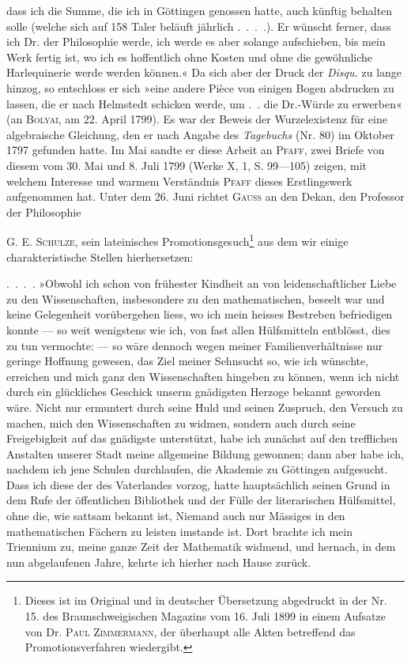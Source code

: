 dass ich die Summe, die ich in Göttingen genossen hatte, auch künftig behalten
solle (welche sich auf 158 Taler beläuft jährlich .\ .\ .\ .). Er wünscht
ferner, dass ich Dr. der Philosophie werde, ich werde es aber solange aufschieben,
bis mein Werk fertig ist, wo ich es hoffentlich ohne Kosten und
ohne die gewöhnliche Harlequinerie werde werden können.« Da sich aber der
Druck der \textit{Disqu.} zu lange hinzog, so entschloss er sich »eine andere Pièce
von einigen Bogen abdrucken zu lassen, die er nach Helmstedt schicken werde,
um .\ . die Dr.-Würde zu erwerben« (an \textsc{Bolyai}, am 22. April 1799). Es war
der Beweis der Wurzelexistenz für eine algebraische Gleichung, den er nach
Angabe des \textit{Tagebuchs} (Nr. 80) im Oktober 1797 gefunden hatte. Im Mai
sandte er diese Arbeit an \textsc{Pfaff}, zwei Briefe von diesem vom 30. Mai und
8. Juli 1799 (Werke X, 1, S. 99—105) zeigen, mit welchem Interesse und
warmem Verständnis \textsc{Pfaff} dieses Erstlingswerk aufgenommen hat. Unter
dem 26. Juni richtet \textsc{Gauss} an den Dekan, den Professor der Philosophie\par
\clearpage{}
\noindent \textsc{G. E. Schulze}, sein lateinisches Promotionsgesuch\footnote{Dieses ist im Original und in deutscher Übersetzung abgedruckt in der Nr. 15. des Braunschweigischen Magazins vom 16. Juli 1899 in einem Aufsatze von Dr. \textsc{Paul Zimmermann}, der überhaupt alle Akten betreffend das Promotionsverfahren wiedergibt.} aus dem wir einige charakteristische
Stellen hierhersetzen:

.\ .\ .\ . »Obwohl ich schon von frühester Kindheit an von leidenschaftlicher
Liebe zu den Wissenschaften, insbesondere zu den mathematischen,
beseelt war und keine Gelegenheit vorübergehen liess, wo ich
mein heisses Bestreben befriedigen konnte — so weit wenigstens wie ich,
von fast allen Hülfsmitteln entblösst, dies zu tun vermochte: — so wäre
dennoch wegen meiner Familienverhältnisse nur geringe Hoffnung gewesen,
das Ziel meiner Sehnsucht so, wie ich wünschte, erreichen und mich ganz
den Wissenschaften hingeben zu können, wenn ich nicht durch ein glückliches
Geschick unserm gnädigsten Herzoge bekannt geworden wäre. Nicht
nur ermuntert durch seine Huld und seinen Zuspruch, den Versuch zu machen,
mich den Wissenschaften zu widmen, sondern auch durch seine Freigebigkeit
auf das gnädigste unterstützt, habe ich zunächst auf den trefflichen Anstalten
unserer Stadt meine allgemeine Bildung gewonnen; dann aber habe ich, nachdem
ich jene Schulen durchlaufen, die Akademie zu Göttingen aufgesucht.
Dass ich diese der des Vaterlandes vorzog, hatte hauptsächlich seinen Grund
in dem Rufe der öffentlichen Bibliothek und der Fülle der literarischen Hülfsmittel,
ohne die, wie sattsam bekannt ist, Niemand auch nur Mässiges in den
mathematischen Fächern zu leisten imstande ist. Dort brachte ich mein
Triennium zu, meine ganze Zeit der Mathematik widmend, und hernach, in
dem nun abgelaufenen Jahre, kehrte ich hierher nach Hause zurück.

